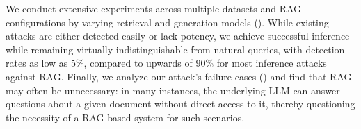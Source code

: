 We conduct extensive experiments across multiple datasets and RAG configurations by varying retrieval and generation models ().
While existing attacks are either detected easily or lack potency, we achieve successful inference while remaining virtually indistinguishable from natural queries, with detection rates as low as 5\%, compared to upwards of 90\% for most inference attacks against RAG.
Finally, we analyze our attack's failure cases () and find that RAG may often be unnecessary: in many instances, the underlying LLM can answer questions about a given document without direct access to it, thereby questioning the necessity of a RAG-based system for such scenarios.
